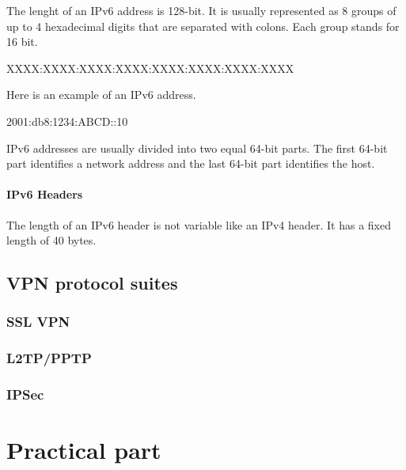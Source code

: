 \documentclass[a4paper]{report}
\begin{document}
The lenght of an IPv6 address is 128-bit. It is usually represented as 8 groups of up to 4 hexadecimal digits that are separated with colons. Each group stands for 16 bit.
\begin{shaded}
	XXXX:XXXX:XXXX:XXXX:XXXX:XXXX:XXXX:XXXX
\end{shaded}
Here is an example of an IPv6 address.
\begin{shaded}
	2001:db8:1234:ABCD::10
\end{shaded}
IPv6 addresses are usually divided into two equal 64-bit parts. The first 64-bit part identifies a network address and the last 64-bit part identifies the host.\parencite[144-146]{Loshin2004}
 
\subsubsection{IPv6 Headers}
\label{sssec:ipv6:headers}
The length of an IPv6 header is not variable like an IPv4 header. It has a fixed length of 40 bytes.


\section{VPN protocol suites}
\label{sec:VPNs}

\subsection{SSL VPN}
\label{ssec:sslvpn}

\subsection{L2TP/PPTP}
\label{ssec:l2tppptp}

\subsection{IPSec}
\label{ssec:IPSec}


\chapter{Practical part}
\label{ch:Practical}

\newpage

\printbibliography
\end{document}
